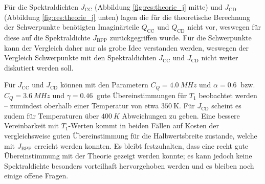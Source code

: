 Für die Spektraldichten $J_\text{CC}$ (Abbildung \ref{fig:res:theorie_j} mitte) und $J_\text{CD}$ (Abbildung \ref{fig:res:theorie_j} unten) lagen die für die theoretische Berechnung der Schwerpunkte benötigten Imaginärteile $Q_\text{CC}$ und $Q_\text{CD}$ nicht vor, weswegen für diese auf die Spektraldichte $J_\text{BPP}$ zurückgegriffen wurde. Für die Schwerpunkte kann der Vergleich daher nur als grobe Idee verstanden werden, weswegen der Vergleich Schwerpunkte mit den Spektraldichten $J_\text{CC}$ und $J_\text{CD}$ nicht weiter diskutiert werden soll.

Für $J_\text{CC}$ und $J_\text{CD}$ können mit den Parametern $C_Q = \SI{4.0}{MHz}$ und $\alpha = \SI{0.6}{}$ bzw. $C_Q = \SI{3.6}{MHz}$ und $\gamma = \SI{0.46}{}$ gute Übereinstimmungen für $T_1$ beobachtet werden -- zumindest oberhalb einer Temperatur von etwa $\SI{350}{\kelvin}$. Für $J_\text{CD}$ scheint es zudem für Temperaturen über $\SI{400}{K}$ Abweichungen zu geben. Eine bessere Vereinbarkeit mit $T_1$-Werten kommt in beiden Fällen auf Kosten der vergleichsweise guten Übereinstimmung für die Halbwertsbreite zustande, welche mit $J_\text{BPP}$ erreicht werden konnten. Es bleibt festzuhalten, dass eine recht gute Übereinstimmung mit der Theorie gezeigt werden konnte; es kann jedoch keine Spektraldichte besonders vorteilhaft hervorgehoben werden und es bleiben noch einige offene Fragen.


